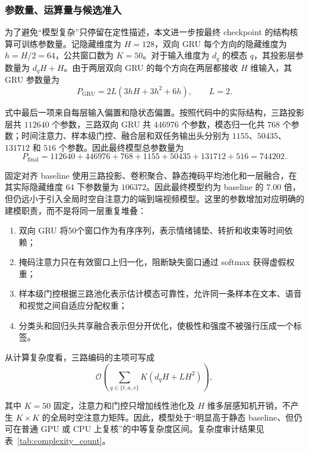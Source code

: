 \documentclass{gmcmthesis}
\begin{document}
\subsubsection{参数量、运算量与候选准入}
为了避免“模型复杂”只停留在定性描述，本文进一步按最终 checkpoint 的结构核算可训练参数量。记隐藏维度为 $H=128$，双向 GRU 每个方向的隐藏维度为 $h=H/2=64$，公共窗口数为 $K=50$。对于输入维度为 $d_q$ 的模态 $q$，其投影层参数量为 $d_qH+H$。由于两层双向 GRU 的每个方向在两层都接收 $H$ 维输入，其 GRU 参数量为
\begin{equation}
P_{\mathrm{GRU}}=2L\left(3hH+3h^2+6h\right),\qquad L=2.
\label{eq:gru_params}
\end{equation}
\par\indent 式中最后一项来自每层输入偏置和隐状态偏置。按照代码中的实际结构，三路投影层共 $112640$ 个参数，三路双向 GRU 共 $446976$ 个参数，模态归一化共 $768$ 个参数；时间注意力、样本级门控、融合层和双任务输出头分别为 $1155$、$50435$、$131712$ 和 $516$ 个参数。因此最终模型总参数量为
\begin{equation}
P_{\mathrm{final}}=112640+446976+768+1155+50435+131712+516=744202.
\label{eq:final_params}
\end{equation}

固定对齐 baseline 使用三路投影、卷积聚合、静态掩码平均池化和一层融合，在其实际隐藏维度 $64$ 下参数量为 $106372$。因此最终模型约为 baseline 的 $7.00$ 倍，但仍远小于引入全局时空自注意力的端到端视频模型。这里的参数增加对应明确的建模职责，而不是将同一层重复堆叠：
\begin{enumerate}[label=(\arabic*)]
\item 双向 GRU 将50个窗口作为有序序列，表示情绪铺垫、转折和收束等时间依赖；
\item 掩码注意力只在有效窗口上归一化，阻断缺失窗口通过 softmax 获得虚假权重；
\item 样本级门控根据三路池化表示估计模态可靠性，允许同一条样本在文本、语音和视觉之间自适应分配权重；
\item 分类头和回归头共享融合表示但分开优化，使极性和强度不被强行压成一个标签。
\end{enumerate}

\par\indent 从计算复杂度看，三路编码的主项可写成
\begin{equation}
\mathcal{O}\left(\sum_{q\in\{t,a,v\}}K(d_qH+LH^2)\right),
\label{eq:complexity}
\end{equation}
\par\indent 其中 $K=50$ 固定，注意力和门控只增加线性池化及 $H$ 维多层感知机开销，不产生 $K\times K$ 的全局时空注意力矩阵。因此，模型处于“明显高于静态 baseline、但仍可在普通 GPU 或 CPU 上复核”的中等复杂度区间。复杂度审计结果见表~\ref{tab:complexity_count}。
\end{document}
